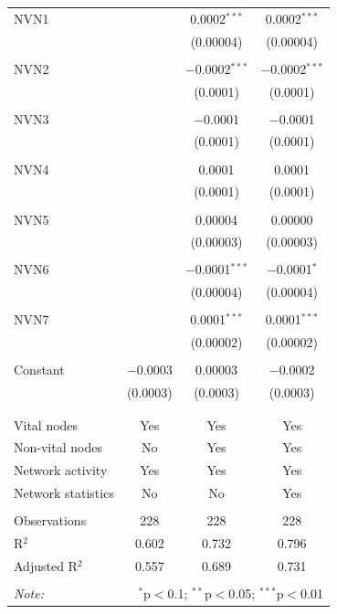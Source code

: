 \begin{table}[!htbp]
\begin{tabular}{@{\extracolsep{5pt}}lccc}
 NVN1 &  & 0.0002$^{***}$ & 0.0002$^{***}$ \\ 
  &  & (0.00004) & (0.00004) \\ 
  & & & \\ 
 NVN2 &  & $-$0.0002$^{***}$ & $-$0.0002$^{***}$ \\ 
  &  & (0.0001) & (0.0001) \\ 
  & & & \\ 
 NVN3 &  & $-$0.0001 & $-$0.0001 \\ 
  &  & (0.0001) & (0.0001) \\ 
  & & & \\ 
 NVN4 &  & 0.0001 & 0.0001 \\ 
  &  & (0.0001) & (0.0001) \\ 
  & & & \\ 
 NVN5 &  & 0.00004 & 0.00000 \\ 
  &  & (0.00003) & (0.00003) \\ 
  & & & \\ 
 NVN6 &  & $-$0.0001$^{***}$ & $-$0.0001$^{*}$ \\ 
  &  & (0.00004) & (0.00004) \\ 
  & & & \\ 
 NVN7 &  & 0.0001$^{***}$ & 0.0001$^{***}$ \\ 
  &  & (0.00002) & (0.00002) \\ 
  & & & \\ 
 Constant & $-$0.0003 & 0.00003 & $-$0.0002 \\ 
  & (0.0003) & (0.0003) & (0.0003) \\ 
  & & & \\ 
\hline \\[-1.8ex] 
Vital nodes & Yes & Yes & Yes \\ 
Non-vital nodes & No & Yes & Yes \\ 
Network activity & Yes & Yes & Yes \\ 
Network statistics & No & No & Yes \\ 
\hline &  &  &  \\ 
Observations & 228 & 228 & 228 \\ 
R$^{2}$ & 0.602 & 0.732 & 0.796 \\ 
Adjusted R$^{2}$ & 0.557 & 0.689 & 0.731 \\ 
\hline 
\hline \\[-1.8ex] 
\textit{Note:}  & \multicolumn{3}{r}{$^{*}$p$<$0.1; $^{**}$p$<$0.05; $^{***}$p$<$0.01} \\ 
\end{tabular} 
\end{table} 
